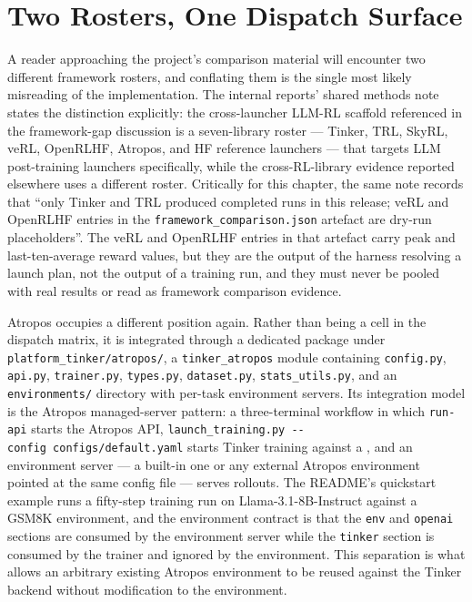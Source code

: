 \documentclass[12pt,a4paper]{report}
\newcommand{\longtok}[1]{\texttt{\seqsplit{#1}}}
\begin{document}
\section{Two Rosters, One Dispatch
Surface}\label{two-rosters-one-dispatch-surface}

A reader approaching the project's comparison material will encounter
two different framework rosters, and conflating them is the single most
likely misreading of the implementation. The internal reports' shared
methods note states the distinction explicitly: the cross-launcher
LLM-RL scaffold referenced in the framework-gap discussion is a
seven-library roster --- Tinker, TRL, SkyRL, veRL, OpenRLHF, Atropos,
and HF reference launchers --- that targets LLM post-training launchers
specifically, while the cross-RL-library evidence reported elsewhere
uses a different roster. Critically for this chapter, the same note
records that ``only Tinker and TRL produced completed runs in this
release; veRL and OpenRLHF entries in the
\texttt{framework\_comparison.json} artefact are dry-run placeholders''.
The veRL and OpenRLHF entries in that artefact carry peak and
last-ten-average reward values, but they are the output of the harness
resolving a launch plan, not the output of a training run, and they must
never be pooled with real results or read as framework comparison
evidence.

Atropos occupies a different position again. Rather than being a cell in
the dispatch matrix, it is integrated through a dedicated package under
\texttt{platform\_tinker/atropos/}, a \texttt{tinker\_atropos} module
containing \texttt{config.py}, \texttt{api.py}, \texttt{trainer.py},
\texttt{types.py}, \texttt{dataset.py}, \texttt{stats\_utils.py}, and an
\texttt{environments/} directory with per-task environment servers. Its
integration model is the Atropos managed-server pattern: a
three-terminal workflow in which \texttt{run-api} starts the Atropos
API, \texttt{launch\_training.py\ -\/-config\ configs/default.yaml}
starts Tinker training against a \longtok{TINKER\_\allowbreak{}API\_\allowbreak{}KEY}, and an
environment server --- a built-in one or any external Atropos
environment pointed at the same config file --- serves rollouts. The
README's quickstart example runs a fifty-step training run on
Llama-3.1-8B-Instruct against a GSM8K environment, and the environment
contract is that the \texttt{env} and \texttt{openai} sections are
consumed by the environment server while the \texttt{tinker} section is
consumed by the trainer and ignored by the environment. This separation
is what allows an arbitrary existing Atropos environment to be reused
against the Tinker backend without modification to the environment.
\end{document}
